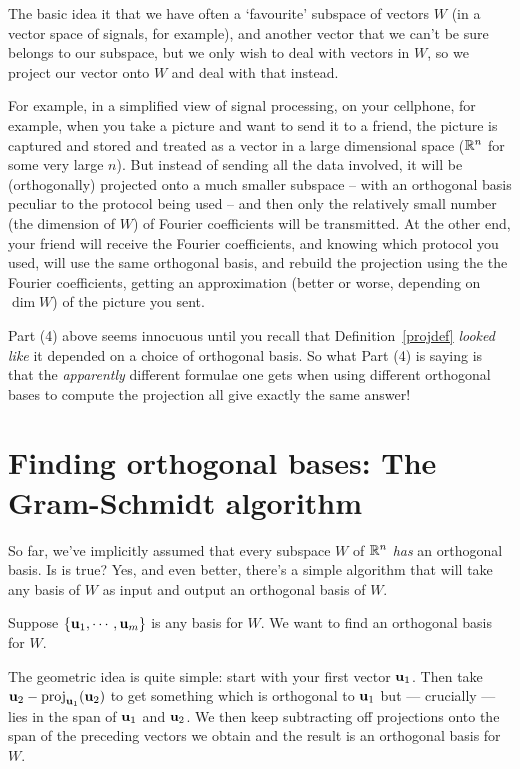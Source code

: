 \medskip

The basic idea it that we have often a `favourite' subspace of vectors $W$ (in a vector space of signals, for example), and another vector that we can't be sure belongs to our subspace, but we only wish to deal with vectors in $W$\kern-2pt, so we project our vector onto $W$ and deal with that instead. 

For example, in a simplified view of signal processing, on your cellphone, for example, when you take a picture and want to send it to a friend, the picture is captured and stored and treated as a vector in a large dimensional space ($\mathbb{R}^n$ for some very large $n$). But instead of sending all the data involved, it will be (orthogonally) projected onto a much smaller subspace -- with an  orthogonal basis peculiar to the protocol being used -- and then only the relatively small number (the dimension of $W$) of Fourier coefficients  will be transmitted. At the other end, your friend will receive the Fourier coefficients, and knowing which  protocol you used, will use the same  orthogonal basis, and rebuild the projection using the the Fourier coefficients, getting an approximation (better or worse, depending on $\dim W$) of the picture you sent.

\medskip

Part (4) above seems innocuous until you recall that Definition~\ref{projdef} {\it looked like} it depended on a choice of orthogonal basis. So what Part (4) is saying is that the {\it apparently} different formulae one gets when using different orthogonal bases to compute the projection all give exactly the same answer!

\section{Finding orthogonal bases: The Gram-Schmidt algorithm}\label{section:Gram-Schmidt}

So far, we've implicitly assumed that every subspace $W$ of $\mathbb{R}^n$ {\it has} an orthogonal basis. Is is true? Yes, and even better, there's a simple algorithm that will take any basis of $W$ as input and output an orthogonal basis of $W$. 

\medskip
 

Suppose  $\{\mathbf{u}_1, \cdots, \mathbf{u}_m  \}$ is any basis for $W$.  We want to find an orthogonal
basis for $W$.

The geometric idea is quite simple:  start with your first vector $\mathbf{u}_1$.
Then take $\mathbf{u}_2 - \operatorname{proj}_{\mathbf{u}_1}(\mathbf{u}_2)$ to get something which is
orthogonal to $\mathbf{u}_1$ but --- crucially --- lies in the span of $\mathbf{u}_1$
and $\mathbf{u}_2$.  We then keep subtracting off projections onto the span of the
preceding vectors we obtain and the result is an orthogonal basis for $W$.

